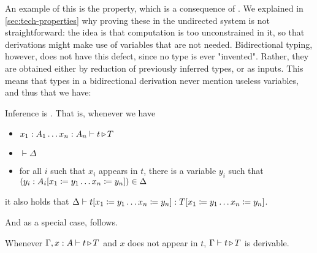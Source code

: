 An example of this is the  property, which is a consequence of
. We explained in \cref{sec:tech-properties}
why proving these in the undirected system is not straightforward: the idea is that 
computation is too unconstrained in it, so that derivations might make use of variables that
are not needed.
Bidirectional typing, however, does not have this defect, since no type is ever "invented".
Rather, they are obtained either by reduction of previously inferred types, or as inputs.
This means that types in a bidirectional derivation never mention useless variables, and thus
that we have:

\begin{theorem}
  \label{thm:strong-stab-renaming-bidir}
  Inference is . That is, whenever we have 
  \begin{itemize}
    \item $x_1 : A_1 \dots x_n : A_n \vdash t \operatorname{\triangleright} T$
    \item $\vdash \Delta$
    \item for all $i$ such that $x_i$ appears in $t$,
      there is a variable $y_i$ such that $(y_i : A_i[x_1 \coloneqq y_1 \dots x_n \coloneqq y_n]) \in \Delta$
  \end{itemize} 
  it also holds that $\Delta \vdash t[x_1 \coloneqq y_1 \dots x_n \coloneqq y_n] : T[x_1 \coloneqq y_1 \dots x_n \coloneqq y_n]$.
\end{theorem}

And as a special case,  follows.

\begin{theorem}
  \label{thm:strengthening-bidir}
  Whenever $\Gamma, x : A \vdash t \operatorname{\triangleright} T$ and $x$ does not appear in $t$,
  $\Gamma \vdash t \operatorname{\triangleright} T$ is derivable.
\end{theorem}

